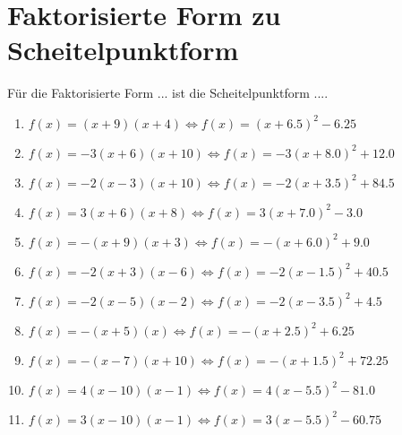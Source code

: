 \documentclass{article}%
\begin{document}
\section{Faktorisierte Form zu Scheitelpunktform}%
\label{sec:FaktorisierteFormzuScheitelpunktform}%
Für die Faktorisierte Form ... ist die Scheitelpunktform ....%
\begin{enumerate}[label=\alph*)]%
\item%
\newline\vspace{0.5cm}$f(x)=(x+9)(x+4)\Leftrightarrow f(x)=(x+6.5)^2 -6.25$%
\item%
\newline\vspace{0.5cm}$f(x)=-3(x+6)(x+10)\Leftrightarrow f(x)=-3(x+8.0)^2 +12.0$%
\item%
\newline\vspace{0.5cm}$f(x)=-2(x-3)(x+10)\Leftrightarrow f(x)=-2(x+3.5)^2 +84.5$%
\item%
\newline\vspace{0.5cm}$f(x)=3(x+6)(x+8)\Leftrightarrow f(x)=3(x+7.0)^2 -3.0$%
\item%
\newline\vspace{0.5cm}$f(x)=-(x+9)(x+3)\Leftrightarrow f(x)=-(x+6.0)^2 +9.0$%
\item%
\newline\vspace{0.5cm}$f(x)=-2(x+3)(x-6)\Leftrightarrow f(x)=-2(x-1.5)^2 +40.5$%
\item%
\newline\vspace{0.5cm}$f(x)=-2(x-5)(x-2)\Leftrightarrow f(x)=-2(x-3.5)^2 +4.5$%
\item%
\newline\vspace{0.5cm}$f(x)=-(x+5)(x)\Leftrightarrow f(x)=-(x+2.5)^2 +6.25$%
\item%
\newline\vspace{0.5cm}$f(x)=-(x-7)(x+10)\Leftrightarrow f(x)=-(x+1.5)^2 +72.25$%
\item%
\newline\vspace{0.5cm}$f(x)=4(x-10)(x-1)\Leftrightarrow f(x)=4(x-5.5)^2 -81.0$%
\item%
\newline\vspace{0.5cm}$f(x)=3(x-10)(x-1)\Leftrightarrow f(x)=3(x-5.5)^2 -60.75$%

\end{enumerate}
\end{document}
